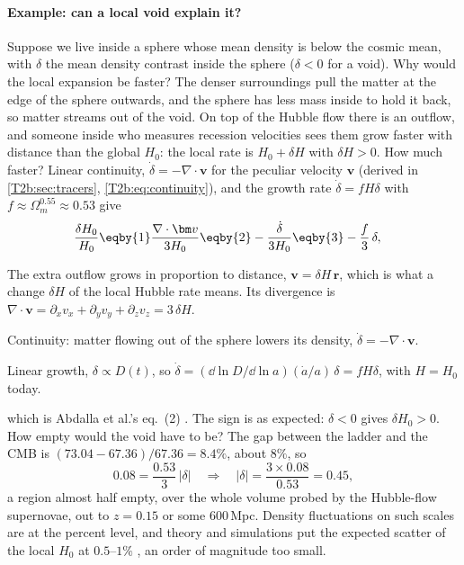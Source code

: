 \paragraph{Example: can a local void explain it?} Suppose we live inside a sphere whose mean density is below the cosmic mean, with $\delta$ the mean density contrast inside the sphere ($\delta<0$ for a void). Why would the local expansion be faster? The denser surroundings pull the matter at the edge of the sphere outwards, and the sphere has less mass inside to hold it back, so matter streams out of the void. On top of the Hubble flow there is an outflow, and someone inside who measures recession velocities sees them grow faster with distance than the global $H_0$: the local rate is $H_0+\delta H$ with $\delta H>0$. How much faster? Linear continuity, $\dot\delta=-\nabla\cdot\bm v$ for the peculiar velocity $\bm v$ (derived in \cref{T2b:sec:tracers}, \eqref{T2b:eq:continuity}), and the growth rate $\dot\delta=fH\delta$ with $f\approx\Omega_m^{0.55}\approx0.53$ give
\begin{align}
  \frac{\delta H_0}{H_0}
  &\eqby{1}\frac{\nabla\cdot\bm v}{3H_0}
  \eqby{2}-\frac{\dot\delta}{3H_0}
  \eqby{3}-\frac{f}{3}\,\delta ,
  \label{T2b:eq:void}
\end{align}
\begin{explain}
  \item The extra outflow grows in proportion to distance, $\bm v=\delta H\,\bm r$, which is what a change $\delta H$ of the local Hubble rate means. Its divergence is $\nabla\cdot\bm v=\partial_xv_x+\partial_yv_y+\partial_zv_z=3\,\delta H$.
  \item Continuity: matter flowing out of the sphere lowers its density, $\dot\delta=-\nabla\cdot\bm v$.
  \item Linear growth, $\delta\propto D(t)$, so $\dot\delta=(\dd\ln D/\dd\ln a)(\dot a/a)\,\delta=fH\delta$, with $H=H_0$ today.
\end{explain}
which is Abdalla et al.'s eq.~(2) \cite[Sec.~IV.F]{Abdalla2022}. The sign is as expected: $\delta<0$ gives $\delta H_0>0$. How empty would the void have to be? The gap between the ladder and the CMB is $(73.04-67.36)/67.36=8.4\%$, about $8\%$, so
\[
  0.08=\frac{0.53}{3}\,|\delta|\quad\Longrightarrow\quad|\delta|=\frac{3\times0.08}{0.53}=0.45 ,
\]
a region almost half empty, over the whole volume probed by the Hubble-flow supernovae, out to $z=0.15$ or some $600$\,Mpc. Density fluctuations on such scales are at the percent level, and theory and simulations put the expected scatter of the local $H_0$ at $0.5$--$1\%$ \cite[Sec.~IV.F]{Abdalla2022}, an order of magnitude too small.

